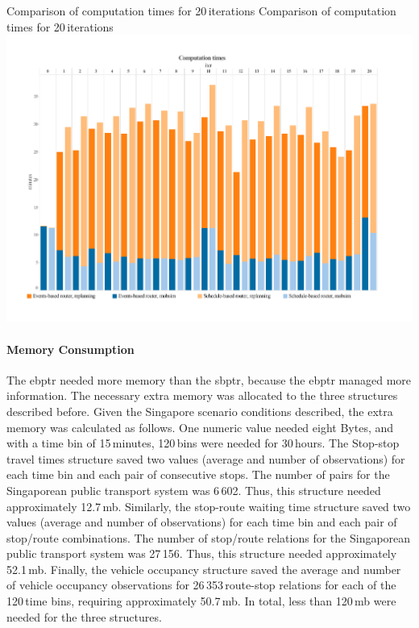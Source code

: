 \createfigure
{Comparison of computation times for 20\,iterations}
{Comparison of computation times for 20\,iterations}
{\label{fig:CompTimes}}
{\includegraphics[width=1.0\textwidth]{extending/figures/ebr/ComputationTimes.pdf}}
{}

\paragraph{Memory Consumption}

The \gls{ebptr} needed more memory than the \gls{sbptr}, because the \gls{ebptr} managed more information. The necessary extra memory was allocated to the three structures described before. Given the Singapore scenario conditions described, the extra memory was calculated as follows. One numeric value needed eight Bytes, and with a time bin of 15\,minutes, 120\,bins were needed for 30\,hours. The Stop-stop travel times structure saved two values (average and number of observations) for each time bin and each pair of consecutive stops. The number of pairs for the Singaporean public transport system was 6\,602. Thus, this structure needed approximately 12.7\,\gls{mb}. Similarly, the stop-route waiting time structure saved two values (average and number of observations) for each time bin and each pair of stop/route combinations. The number of stop/route relations for the Singaporean public transport system was 27\,156. Thus, this structure needed approximately 52.1\,\gls{mb}. Finally, the vehicle occupancy structure saved the average and number of vehicle occupancy observations for 26\,353\,route-stop relations for each of the 120\,time bins,  requiring approximately 50.7\,\gls{mb}. In total, less than 120\,\gls{mb} were needed for the three structures.

